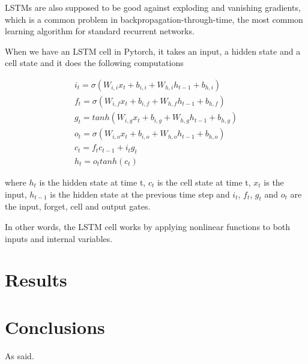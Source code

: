 \documentclass[runningheads]{llncs}
\begin{document}
LSTMs are also supposed to be good against exploding and vanishing gradients, which is a common problem in backpropagation-through-time, the most common learning algorithm for standard recurrent networks.


When we have an LSTM cell in Pytorch, it takes an input, a hidden state and a cell state and it does the following computations

\begin{gather}
	i_t = \sigma(W_{i,i} x_t + b_{i,i} + W_{h,i} h_{t-1} + b_{h,i}) \\
	f_t = \sigma(W_{i,f}x_t + b_{i,f} + W_{h,f}h_{t-1} + b_{h,f}) \\
	g_t = tanh(W_{i,g}x_t + b_{i,g} + W_{h,g}h_{t-1} + b_{h,g}) \\
	o_t = \sigma(W_{i,o}x_t + b_{i,o} + W_{h,o}h_{t-1} + b_{h,o}) \\
	c_t = f_tc_{t-1} + i_tg_t \\
	h_t = o_t tanh(c_t)
\end{gather}

where $h_t$ is the hidden state at time t, $c_t$ is the cell state at time t, $x_t$ is the input, $h_{t-1}$ is the hidden state at the previous time step and $i_t$, $f_t$, $g_t$ and $o_t$ are the input, forget, cell and output gates. \cite{torchdoc}

In other words, the LSTM cell works by applying nonlinear functions to both inputs and internal variables. 



\section{Results}
\section{Conclusions}


As \cite{Alpher04} said.







\end{document}
